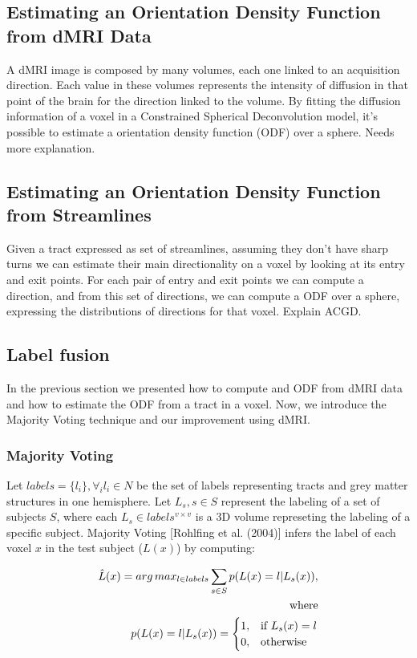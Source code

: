 \subsection{Estimating an Orientation Density Function from dMRI Data}
A dMRI image is composed by many volumes, each one linked to an acquisition
direction. Each value in these volumes represents the intensity of diffusion
in that point of the brain for the direction linked to the volume. By fitting
the diffusion information of a voxel in a Constrained Spherical Deconvolution
model, it's possible to estimate a orientation density function (ODF) over a
sphere. Needs more explanation.

\subsection{Estimating an Orientation Density Function from Streamlines}
Given a tract expressed as set of streamlines, assuming they don't have sharp
turns we can estimate their main directionality on a voxel by looking at its
entry and exit points. For each pair of entry and exit points we can compute a
direction, and from this set of directions, we can compute a ODF over a sphere,
expressing the distributions of directions for that voxel. Explain ACGD.

\subsection{Label fusion}
In the previous section we presented how to compute and ODF from dMRI data and
how to estimate the ODF from a tract in a voxel. Now, we introduce the Majority
Voting technique and our improvement using dMRI.

\subsubsection{Majority Voting}
Let $labels = \{l_i\}, \forall_i l_i \in N$ be the set of labels representing
tracts and grey matter structures in one hemisphere. Let ${L_s}, s \in S$
represent the labeling of a set of subjects $S$, where each 
$L_s \in labels^{v\times v}$ is a 3D volume represeting the labeling of a
specific subject. Majority Voting [Rohlfing et al. (2004)] infers the label of
each voxel $x$ in the test subject ($L(x)$) by computing:

\begin{equation}
\label{eq:mvoting}
\begin{aligned}
    \hat L(x) = arg\,max_{l \in labels} \sum_{s\in S} p(L(x) = l | L_s(x)),\\
    \text{where} \\
    p(L(x) = l | L_s(x)) =
    \begin{cases}
        1,& \text{if } L_s(x) = l \\
        0,& \text{otherwise}
    \end{cases}
\end{aligned}
\end{equation}

